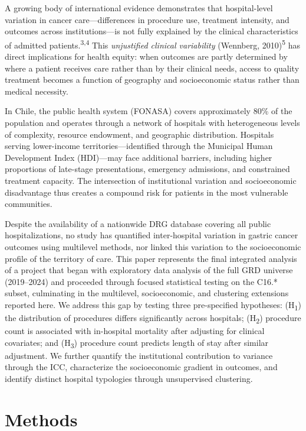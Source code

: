 \documentclass[10pt,twocolumn]{article}
\begin{document}
A growing body of international evidence demonstrates that hospital-level variation in
cancer care—differences in procedure use, treatment intensity, and outcomes across
institutions—is not fully explained by the clinical characteristics of admitted
patients.\textsuperscript{3,4} This \textit{unjustified clinical variability}
(Wennberg, 2010)\textsuperscript{5} has direct implications for health equity: when
outcomes are partly determined by where a patient receives care rather than by their
clinical needs, access to quality treatment becomes a function of geography and
socioeconomic status rather than medical necessity.

In Chile, the public health system (FONASA) covers approximately 80\% of the
population and operates through a network of hospitals with heterogeneous levels of
complexity, resource endowment, and geographic distribution. Hospitals serving
lower-income territories—identified through the Municipal Human Development Index
(HDI)—may face additional barriers, including higher proportions of late-stage
presentations, emergency admissions, and constrained treatment capacity. The
intersection of institutional variation and socioeconomic disadvantage thus creates
a compound risk for patients in the most vulnerable communities.

Despite the availability of a nationwide DRG database covering all public
hospitalizations, no study has quantified inter-hospital variation in gastric cancer
outcomes using multilevel methods, nor linked this variation to the socioeconomic
profile of the territory of care. This paper represents the final integrated analysis
of a project that began with exploratory data analysis of the full GRD universe
(2019--2024) and proceeded through focused statistical testing on the C16.* subset,
culminating in the multilevel, socioeconomic, and clustering extensions reported here.
We address this gap by testing three pre-specified
hypotheses: (H\textsubscript{1}) the distribution of procedures differs significantly
across hospitals; (H\textsubscript{2}) procedure count is associated with in-hospital
mortality after adjusting for clinical covariates; and (H\textsubscript{3}) procedure
count predicts length of stay after similar adjustment. We further quantify the
institutional contribution to variance through the ICC, characterize the
socioeconomic gradient in outcomes, and identify distinct hospital typologies through
unsupervised clustering.

\section{Methods}
\end{document}
